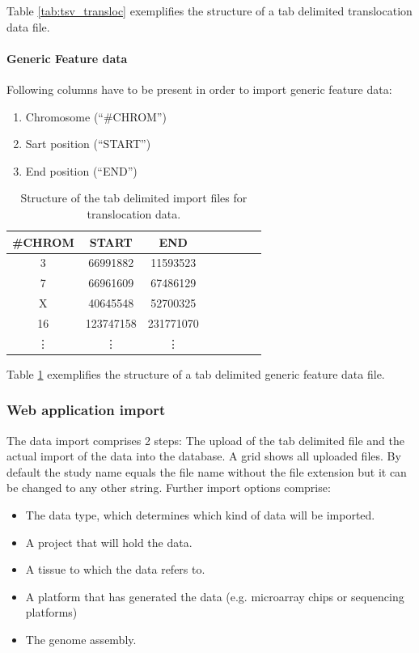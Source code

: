 \documentclass[11pt,final]{article}
\begin{document}
Table \ref{tab:tsv_transloc} exemplifies the structure of a tab delimited
translocation data file.

\paragraph{Generic Feature data}

Following columns have to be present in order to import generic feature data:

\begin{enumerate}
  \item Chromosome (``\#CHROM'')
  \item Sart position (``START'')
  \item End position (``END'')
\end{enumerate}

\begin{table}
	\centering
	\begin{tabular}[h]{|c|c|c|c|c|c|c|c|}
	  \hline
	  \#CHROM & START & END \\ \hline
	 3 & 66991882 & 11593523 \\
         7 & 66961609 & 67486129 \\
         X & 40645548 & 52700325 \\
         16 & 123747158 & 231771070 \\
	 \vdots & \vdots & \vdots \\
	\end{tabular}
	\caption{Structure of the tab delimited import files for translocation
	data.}
	\label{tab:tsv_gen}
\end{table}

Table \ref{tab:tsv_gen} exemplifies the structure of a tab delimited
generic feature data file.

\subsubsection{Web application import}

The data import comprises 2 steps: The upload of the tab delimited file and
the actual import of the data into the database. A grid shows all uploaded
files. By default the study name equals the file name without the file
extension but it can be changed to any other string.
Further import options comprise: 

\begin{itemize}
  \item The data type, which determines which kind of data will be imported.
  \item A project that will hold the data.
  \item A tissue to which the data refers to.
  \item A platform that has generated the data (e.g. microarray chips or
        sequencing platforms)
  \item The genome assembly.
\end{itemize}
\end{document}

